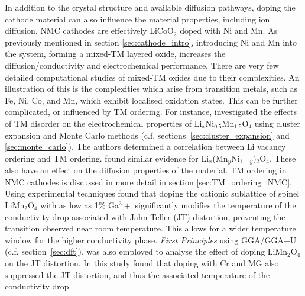 \documentclass[../main.tex]{subfiles}
\begin{document}
In addition to the crystal structure and available diffusion pathways, doping the cathode material can also influence the material properties, including ion diffusion. NMC cathodes are effectively LiCoO$_2$ doped with Ni and Mn. As previously mentioned in section \ref{sec:cathode_intro}, introducing Ni and Mn into the system, forming a mixed-TM layered oxide, increases the diffusion/conductivity and electrochemical performance. There are very few detailed computational studies of mixed-TM oxides due to their complexities. An illustration of this is the complexities which arise from transition metals, such as Fe, Ni, Co, and Mn, which exhibit localised oxidation states. This can be further complicated, or influenced by TM ordering. For instance, \citeauthor{lee2013solid} investigated the effects of TM disorder on the electrochemical properties of Li$_x$Ni$_{0.5}$Mn$_{1.5}$O$_4$ using cluster expansion and Monte Carlo methods (c.f. sections~\ref{sec:cluster_expansion} and \ref{sec:monte_carlo}). The authors determined a correlation between Li vacancy ordering and TM ordering. \cite{lee2013solid} \citeauthor{hao2016quaternary} found similar evidence for Li$_x$(Mn$_y$Ni$_{1-y}$)$_2$O$_4$. \cite{hao2016quaternary} These also have an effect on the diffusion properties of the material. TM ordering in NMC cathodes is discussed in more detail in section \ref{sec:TM_ordering_NMC}. Using experimental techniques \citeauthor{capsoni2002inhibition} found that doping the cationic sublattice of spinel LiMn$_2$O$_4$ with as low as 1\% Ga${^3+}$ significantly modifies the temperature of the conductivity drop associated with Jahn-Teller (JT) distortion, preventing the transition observed near room temperature. \cite{capsoni2002inhibition} This allows for a wider temperature window for the higher conductivity phase. \textit{First Principles} using GGA/GGA+U (c.f. section~\ref{sec:dft}), was also employed to analyse the effect of doping LiMn$_2$O$_4$ on the JT distortion. In this study \citeauthor{singh2009suppression} found that doping with Cr and MG also suppressed the JT distortion, and thus the associated temperature of the conductivity drop. \cite{singh2009suppression} 
\end{document}
